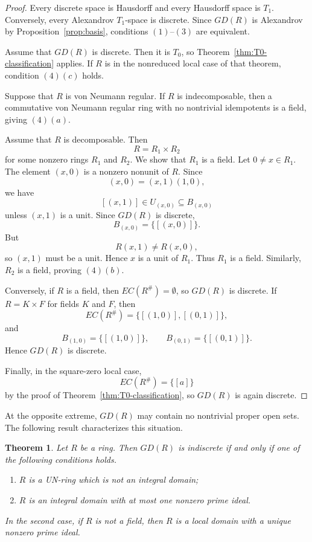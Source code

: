 \documentclass[11pt]{amsart}
\theoremstyle{plain}
\newtheorem{theorem}{Theorem}[section]
\theoremstyle{definition}
\theoremstyle{remark}
\numberwithin{equation}{section}
\begin{document}
\begin{proof}
	Every discrete space is Hausdorff and every Hausdorff space is $T_1$.
	Conversely, every Alexandrov $T_1$-space is discrete. Since $GD(R)$ is
	Alexandrov by Proposition~\ref{prop:basis}, conditions $(1)$--$(3)$ are
	equivalent.
	
	Assume that $GD(R)$ is discrete. Then it is $T_0$, so
	Theorem~\ref{thm:T0-classification} applies. If $R$ is in the
	nonreduced local case of that theorem, condition $(4)(c)$ holds.
	
	Suppose that $R$ is von Neumann regular. If $R$ is indecomposable, then
	a commutative von Neumann regular ring with no nontrivial idempotents is a
	field, giving $(4)(a)$.
	
	Assume that $R$ is decomposable. Then
	\[
	R=R_1\times R_2
	\]
	for some nonzero rings $R_1$ and $R_2$. We show that $R_1$ is a field.
	Let $0\neq x\in R_1$. The element $(x,0)$ is a nonzero nonunit of $R$.
	Since
	\[
	(x,0)=(x,1)(1,0),
	\]
	we have
	\[
	[(x,1)]\in U_{(x,0)}\subseteq B_{(x,0)}
	\]
	unless $(x,1)$ is a unit. Since $GD(R)$ is discrete,
	\[
	B_{(x,0)}=\{[(x,0)]\}.
	\]
	But
	\[
	R(x,1)\neq R(x,0),
	\]
	so $(x,1)$ must be a unit. Hence $x$ is a unit of $R_1$. Thus $R_1$
	is a field. Similarly, $R_2$ is a field, proving $(4)(b)$.
	
	Conversely, if $R$ is a field, then $EC(R^\#)=\emptyset$, so $GD(R)$
	is discrete. If $R=K\times F$ for fields $K$ and $F$, then
	\[
	EC(R^\#)
	=
	\{[(1,0)],[(0,1)]\},
	\]
	and
	\[
	B_{(1,0)}=\{[(1,0)]\},
	\qquad
	B_{(0,1)}=\{[(0,1)]\}.
	\]
	Hence $GD(R)$ is discrete.
	
	Finally, in the square-zero local case,
	\[
	EC(R^\#)=\{[a]\}
	\]
	by the proof of Theorem~\ref{thm:T0-classification}, so $GD(R)$ is
	again discrete.
\end{proof}


At the opposite extreme, $GD(R)$ may contain no nontrivial proper open
sets. The following result characterizes this situation.

\begin{theorem}\label{thm:indiscrete}
	Let $R$ be a ring. Then $GD(R)$ is indiscrete if and only if one of the
	following conditions holds.
	\begin{enumerate}
		\item $R$ is a UN-ring which is not an integral domain;
		\item $R$ is an integral domain with at most one nonzero prime ideal.
	\end{enumerate}
	In the second case, if $R$ is not a field, then $R$ is a local domain
	with a unique nonzero prime ideal.
\end{theorem}
\end{document}

